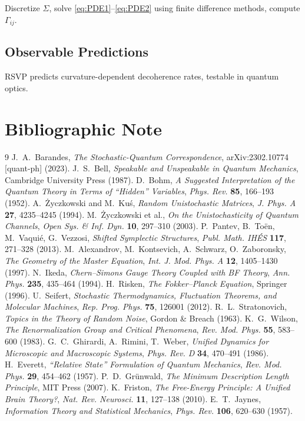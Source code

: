 \documentclass[12pt]{article}
\begin{document}
Discretize \(\Sigma\), solve \eqref{eq:PDE1}–\eqref{eq:PDE2} using finite difference methods, compute \(\Gamma_{ij}\).

\subsection{Observable Predictions}

RSVP predicts curvature-dependent decoherence rates, testable in quantum optics.

\section*{Bibliographic Note}

\begin{thebibliography}{9}
 J.~A.~Barandes, \emph{The Stochastic-Quantum Correspondence}, arXiv:2302.10774 [quant-ph] (2023).
 J.~S.~Bell, \emph{Speakable and Unspeakable in Quantum Mechanics}, Cambridge University Press (1987).
 D.~Bohm, \emph{A Suggested Interpretation of the Quantum Theory in Terms of “Hidden” Variables}, \emph{Phys. Rev.} \textbf{85}, 166–193 (1952).
 A.~Życzkowski and M.~Kuś, \emph{Random Unistochastic Matrices}, \emph{J. Phys. A} \textbf{27}, 4235–4245 (1994).
 M.~Życzkowski et al., \emph{On the Unistochasticity of Quantum Channels}, \emph{Open Sys. \& Inf. Dyn.} \textbf{10}, 297–310 (2003).
 P.~Pantev, B.~Toën, M.~Vaquié, G.~Vezzosi, \emph{Shifted Symplectic Structures}, \emph{Publ. Math. IHÉS} \textbf{117}, 271–328 (2013).
 M.~Alexandrov, M.~Kontsevich, A.~Schwarz, O.~Zaboronsky, \emph{The Geometry of the Master Equation}, \emph{Int. J. Mod. Phys. A} \textbf{12}, 1405–1430 (1997).
 N.~Ikeda, \emph{Chern–Simons Gauge Theory Coupled with BF Theory}, \emph{Ann. Phys.} \textbf{235}, 435–464 (1994).
 H.~Risken, \emph{The Fokker–Planck Equation}, Springer (1996).
 U.~Seifert, \emph{Stochastic Thermodynamics, Fluctuation Theorems, and Molecular Machines}, \emph{Rep. Prog. Phys.} \textbf{75}, 126001 (2012).
 R.~L.~Stratonovich, \emph{Topics in the Theory of Random Noise}, Gordon \& Breach (1963).
 K.~G.~Wilson, \emph{The Renormalization Group and Critical Phenomena}, \emph{Rev. Mod. Phys.} \textbf{55}, 583–600 (1983).
 G.~C.~Ghirardi, A.~Rimini, T.~Weber, \emph{Unified Dynamics for Microscopic and Macroscopic Systems}, \emph{Phys. Rev. D} \textbf{34}, 470–491 (1986).
 H.~Everett, \emph{“Relative State” Formulation of Quantum Mechanics}, \emph{Rev. Mod. Phys.} \textbf{29}, 454–462 (1957).
 P.~D.~Grünwald, \emph{The Minimum Description Length Principle}, MIT Press (2007).
 K.~Friston, \emph{The Free-Energy Principle: A Unified Brain Theory?}, \emph{Nat. Rev. Neurosci.} \textbf{11}, 127–138 (2010).
 E.~T.~Jaynes, \emph{Information Theory and Statistical Mechanics}, \emph{Phys. Rev.} \textbf{106}, 620–630 (1957).
\end{thebibliography}
\end{document}
